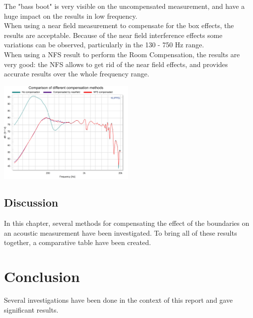 \documentclass{report}
\begin{document}
The "bass boot" is very visible on the uncompensated measurement, and have a huge impact on the results in low frequency. \\
When using a near field measurement to compensate for the box effects, the results are acceptable. Because of the near field interference effects some variations can be observed, particularly in the 130 - 750 Hz range. \\
When using a NFS result to perform the Room Compensation, the results are very good: the NFS allows to get rid of the near field effects, and provides accurate results over the whole frequency range. 

\begin{center}
	\includegraphics[width=0.5\textwidth]{RoomComp/tetbox_res} 
    \captionsetup{hypcap=false} 
	\label{fig:tet_res}
\end{center}


\section{Discussion}

In this chapter, several methods for compensating the effect of the boundaries on an acoustic measurement have been  investigated. To bring all of these results together, a comparative table have been created.


\chapter*{Conclusion}

Several investigations have been done in the context of this report and gave significant results. \\~\\
\end{document}
